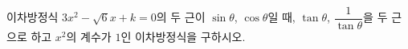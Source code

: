 이차방정식 $3x^2-\sqrt{6}x+k=0$의 두 근이 $\sin\theta$, $\cos\theta$일 때, $\tan\theta$, $\dfrac{1}{\tan\theta}$을 두 근으로 하고 $x^2$의 계수가 $1$인 이차방정식을 구하시오. 
